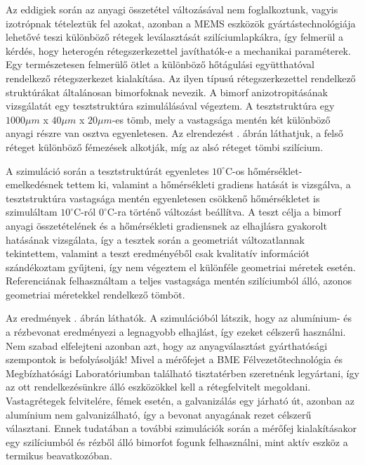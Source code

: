 Az eddigiek során az anyagi összetétel változásával nem foglalkoztunk, vagyis izotrópnak tételeztük fel azokat, azonban a MEMS eszközök gyártástechnológiája lehetővé teszi különböző rétegek leválasztását szilíciumlapkákra, így felmerül a kérdés, hogy heterogén rétegszerkezettel javíthatók-e a mechanikai paraméterek. Egy természetesen felmerülő ötlet a különböző hőtágulási együtthatóval rendelkező rétegszerkezet kialakítása. Az ilyen típusú rétegszerkezettel rendelkező struktúrákat általánosan bimorfoknak nevezik. A bimorf anizotropitásának vizsgálatát egy tesztstruktúra szimulálásával végeztem. A tesztstruktúra egy $1000 \mu m $ x $ 40 \mu m $ x $20 \mu m$-es tömb, mely a vastagsága mentén két különböző anyagi részre van osztva egyenletesen. Az elrendezést . ábrán láthatjuk, a felső réteget különböző fémezések alkotják, míg az alsó réteget tömbi szilícium.

A szimuláció során a tesztstruktúrát egyenletes $10^\circ$C-os hőmérséklet-emelkedésnek tettem ki, valamint a hőmérsékleti gradiens hatását is vizsgálva, a tesztstruktúra vastagsága mentén egyenletesen csökkenő hőmérsékletet is szimuláltam $10^\circ$C-ról $0^\circ$C-ra történő változást beállítva. A teszt célja a bimorf anyagi összetételének és a hőmérsékleti gradiensnek az elhajlásra gyakorolt hatásának vizsgálata, így a tesztek során a geometriát változatlannak tekintettem, valamint a teszt eredményéből csak kvalitatív információt szándékoztam gyűjteni, így nem végeztem el különféle geometriai méretek esetén. Referenciának felhasználtam a teljes vastagsága mentén szilíciumból álló, azonos geometriai méretekkel rendelkező tömböt.

Az eredmények . ábrán láthatók. A szimulációból látszik, hogy az alumínium- és a rézbevonat eredményezi a legnagyobb elhajlást, így ezeket célszerű használni. Nem szabad elfelejteni azonban azt, hogy az anyagválasztást gyárthatósági szempontok is befolyásolják! Mivel a mérőfejet a BME Félvezetőtechnológia és Megbízhatósági Laboratóriumban található tisztatérben szeretnénk legyártani, így az ott rendelkezésünkre álló eszközökkel kell a rétegfelvitelt megoldani. Vastagrétegek felvitelére, fémek esetén, a galvanizálás egy járható út, azonban az alumínium nem galvanizálható, így a bevonat anyagának rezet célszerű választani. Ennek tudatában a további szimulációk során a mérőfej kialakításakor egy szilíciumból és rézből álló bimorfot fogunk felhasználni, mint aktív eszköz a termikus beavatkozóban.

